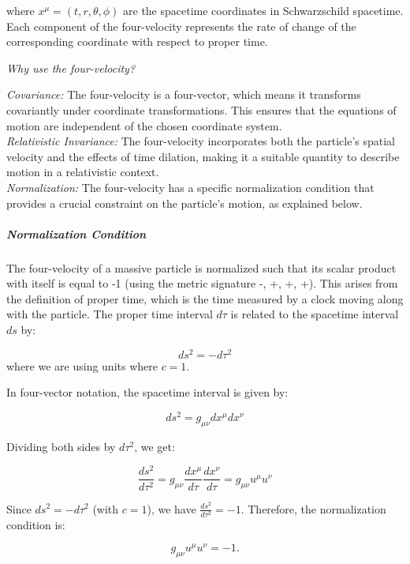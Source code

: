 where \(x^\mu = (t, r, \theta, \phi)\) are the spacetime coordinates in Schwarzschild spacetime. Each component of the four-velocity represents the rate of change of the corresponding coordinate with respect to proper time.

\textit{Why use the four-velocity?}

\textit{Covariance:} The four-velocity is a four-vector, which means it transforms covariantly under coordinate transformations. This ensures that the equations of motion are independent of the chosen coordinate system.\\
\textit{Relativistic Invariance:} The four-velocity incorporates both the particle's spatial velocity and the effects of time dilation, making it a suitable quantity to describe motion in a relativistic context.\\
\textit{Normalization:} The four-velocity has a specific normalization condition that provides a crucial constraint on the particle's motion, as explained below.

\subparagraph{Normalization Condition}

The four-velocity of a massive particle is normalized such that its scalar product with itself is equal to -1 (using the metric signature -, +, +, +). This arises from the definition of proper time, which is the time measured by a clock moving along with the particle. The proper time interval \(d\tau\) is related to the spacetime interval \(ds\) by:

\begin{equation}
ds^2 = - d\tau^2
\end{equation}
where we are using units where $c=1$.

In four-vector notation, the spacetime interval is given by:

\begin{equation}
ds^2 = g_{\mu\nu} dx^\mu dx^\nu
\end{equation}

Dividing both sides by \(d\tau^2\), we get:

\begin{equation}
\frac{ds^2}{d\tau^2} = g_{\mu\nu} \frac{dx^\mu}{d\tau} \frac{dx^\nu}{d\tau} = g_{\mu\nu}u^\mu u^\nu
\end{equation}

Since \(ds^2 = -d\tau^2\) (with $c=1$), we have \(\frac{ds^2}{d\tau^2} = -1\). Therefore, the normalization condition is:

\begin{equation}
g_{\mu\nu}u^\mu u^\nu = -1.
\end{equation}

